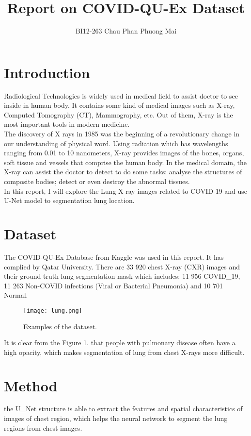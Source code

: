 \documentclass{article}
\title{Report on COVID-QU-Ex Dataset}
\author{BI12-263 Chau Phan Phuong Mai}
\begin{document}
\maketitle

\section{Introduction}
\noindent Radiological Technologies is widely used in medical field to assist doctor to see inside in human body. It contains some kind of medical images such as X-ray, Computed Tomography (CT), Mammography, etc. Out of them, X-ray is the most important tools in modern medicine. \\
\noindent The discovery of X rays in 1985 was the beginning of a revolutionary change in our understanding of physical word. Using radiation which has wavelengths ranging from 0.01 to 10 nanometers, X-ray provides images of the bones, organs, soft tissue and vessels that comprise the human body. In the medical domain, the X-ray can assist the doctor to detect to do some tasks: analyse the structures of composite bodies; detect or even destroy the abnormal tissues.  \\
\noindent In this report, I will explore the Lung X-ray images related to COVID-19 and use U-Net model to segmentation lung location.\\

\section{Dataset}

\noindent The COVID-QU-Ex Database from Kaggle was used in this report. It has complied by Qatar University. There are 33 920 chest X-ray (CXR) images and their ground-truth lung segmentation mask which includes: 11 956 COVID\_19, 11 263 Non-COVID infections (Viral or Bacterial Pneumonia) and 10 701 Normal. \\
\begin{figure}
    \centering
    \texttt{[image: lung.png]}
    \caption{Examples of the dataset.}
    \label{fig:enter-label}
\end{figure}
\noindent
It is clear from the Figure 1. that people with pulmonary disease often have a high opacity, which makes segmentation of lung from chest X-rays more difficult. 

\section{Method}

\noindent the U\_Net structure is able to extract the features and spatial characteristics of images of chest region, which helps the neural network to segment the lung regions from chest images.  \\
\end{document}
